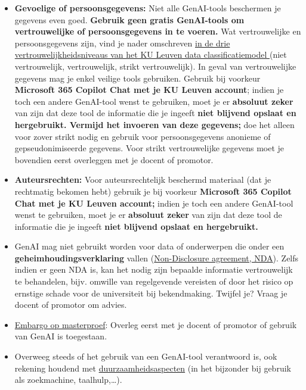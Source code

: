 \begin{itemize}
    \item \textbf{Gevoelige of persoonsgegevens:} Niet alle GenAI-tools beschermen je gegevens even goed. \textbf{Gebruik geen gratis GenAI-tools om vertrouwelijke of persoonsgegevens in te voeren.} Wat vertrouwelijke en persoonsgegevens zijn, vind je nader omschreven \href{https://www.kuleuven.be/onderwijs/learninglab/ondersteuning/genai/richtlijnen-veilig-gebruik-ai-tools#vertrouwelijkheidsniveaus}{in de drie vertrouwelijkheidsniveaus van het KU Leuven data classificatiemodel }(niet vertrouwelijk, vertrouwelijk, strikt vertrouwelijk). In geval van vertrouwelijke gegevens mag je enkel veilige tools gebruiken. Gebruik bij voorkeur \textbf{Microsoft 365 Copilot Chat met je KU Leuven account}; indien je toch een andere GenAI-tool wenst te gebruiken, moet je er \textbf{absoluut zeker} van zijn dat deze tool de informatie die je ingeeft \textbf{niet blijvend opslaat en hergebruikt. Vermijd het invoeren van deze gegevens;} doe het alleen voor zover strikt nodig en gebruik voor persoonsgegevens anonieme of gepseudonimiseerde gegevens. Voor strikt vertrouwelijke gegevens moet je bovendien eerst overleggen met je docent of promotor.
    
    \item \textbf{Auteursrechten:} Voor auteursrechtelijk beschermd materiaal (dat je rechtmatig bekomen hebt) gebruik je bij voorkeur \textbf{Microsoft 365 Copilot Chat met je KU Leuven account;} indien je toch een andere GenAI-tool wenst te gebruiken, moet je er \textbf{absoluut zeker} van zijn dat deze tool de informatie die je ingeeft \textbf{niet blijvend opslaat en hergebruikt.}
    
    \item GenAI mag niet gebruikt worden voor data of onderwerpen die onder een \textbf{geheimhoudingsverklaring} vallen (\href{https://www.kuleuven.be/stuvo/juridischedienst/studiestage/onderzoek}{Non-Disclosure agreement, NDA}). Zelfs indien er geen NDA is, kan het nodig zijn bepaalde informatie vertrouwelijk te behandelen, bijv. omwille van regelgevende vereisten of door het risico op ernstige schade voor de universiteit bij bekendmaking.  Twijfel je? Vraag je docent of promotor om advies.
    
    \item \href{https://iiw.kuleuven.be/studeren/masterproef/embargo}{Embargo op masterproef}: Overleg eerst met je docent of promotor of gebruik van GenAI is toegestaan.
    
    \item Overweeg steeds of het gebruik van een GenAI-tool verantwoord is, ook rekening houdend met \href{https://www.kuleuven.be/genai/duurzaamheid}{duurzaamheidsaspecten} (in het bijzonder bij gebruik als zoekmachine, taalhulp,…).
    

\end{itemize}
